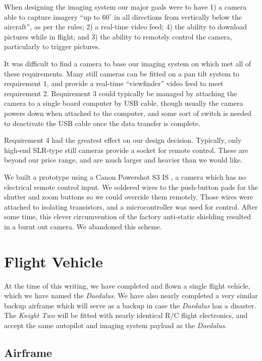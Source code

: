 \documentclass[pdftex,10pt,letter]{article}
\newcommand{\degrees}[1]
{
\begin{math}
#1^{\circ} 
\end{math}
}
\begin{document}
When designing the imaging system our major goals were to have 
1) a camera able to capture imagery ``up to \degrees{60} in all directions from vertically below the aircraft''\cite{competition_rules}, as per the rules; 
2) a real-time video feed;
4) the ability to download pictures while in flight; and
3) the ability to remotely control the camera, particularly to trigger pictures.

It was difficult to find a camera to base our imaging system on which met all of these requirements. Many still cameras can be fitted on a pan tilt system to requirement 1, and provide a real-time ``viewfinder'' video feed to meet requirement 2. Requirement 3 could typically be managed by attaching the camera to a single board computer by USB cable, though usually the camera powers down when attached to the computer, and some sort of switch is needed to deactivate the USB cable once the data transfer is complete.

Requirement 4 had the greatest effect on our design decision. Typically, only high-end SLR-type still cameras provide a socket for remote control. These are beyond our price range, and are much larger and heavier than we would like.

We built a prototype using a Canon Powershot S3 IS \cite{powershotS3}, a camera which has no electrical remote control input. We soldered wires to the push-button pads for the shutter and zoom buttons so we could override them remotely. Those wires were attached to isolating transistors, and a microcontroller was used for control. After some time, this clever circumvention of the factory anti-static shielding resulted in a burnt out camera. We abandoned this scheme.

\section{Flight Vehicle}

At the time of this writing, we have completed and flown a single flight vehicle, which we have named the \emph{Daedalus}.
We have also nearly completed a very similar backup airframe which will serve as a backup in case the \emph{Daedalus} has a disaster. The \emph{Knight Two} will be fitted with nearly identical R/C flight electronics, and accept the same autopilot and imaging system payload as the \emph{Daedalus}.


\subsection{Airframe}
\end{document}
